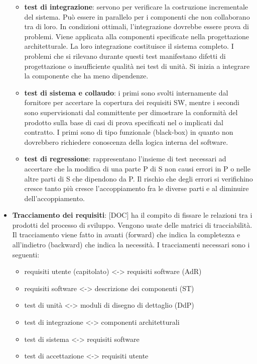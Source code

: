 \begin{itemize}
\begin{itemize}
				\item \textbf{test di integrazione}: servono per verificare la costruzione incrementale del sistema. Può essere in parallelo per i componenti che non collaborano tra di loro. In condizioni ottimali, l'integrazione dovrebbe essere prova di problemi. Viene applicata alla componenti specificate nella progettazione architetturale. La loro integrazione costituisce il sistema completo. I problemi che si rilevano durante questi test manifestano difetti di progettazione o insufficiente qualità nei test di unità. Si inizia a integrare la componente che ha meno dipendenze.

				\item \textbf{test di sistema e collaudo}: i primi sono svolti internamente dal fornitore per accertare la copertura dei requisiti SW, mentre i secondi sono supervisionati dal committente per dimostrare la conformità del prodotto sulla base di casi di prova specificati nel o implicati dal contratto. I primi sono di tipo funzionale (black-box) in quanto non dovrebbero richiedere conoscenza della logica interna del software.

				\item \textbf{test di regressione}: rappresentano l'insieme di test necessari ad accertare che la modifica di una parte P di S non causi errori in P o nelle altre parti di S che dipendono da P. Il rischio che degli errori si verifichino cresce tanto più cresce l'accoppiamento fra le diverse parti e al diminuire dell'accoppiamento.

			\end{itemize}







		\item \textbf{Tracciamento dei requisiti}: [DOC] ha il compito di fissare le relazioni tra i prodotti del processo di sviluppo. Vengono usate delle matrici di tracciabilità. Il tracciamento viene fatto in avanti (forward) che indica la completezza e all'indietro (backward) che indica la necessità. I tracciamenti necessari sono i seguenti:
			\begin{itemize}
				\item requisiti utente (capitolato) <-> requisiti software (AdR)
				\item requisiti software <-> descrizione dei componenti (ST)
				\item test di unità <-> moduli di disegno di dettaglio (DdP)
				\item test di integrazione <-> componenti architetturali
				\item test di sistema <-> requisiti software
				\item test di accettazione <-> requisiti utente
			\end{itemize}

	\end{itemize}
